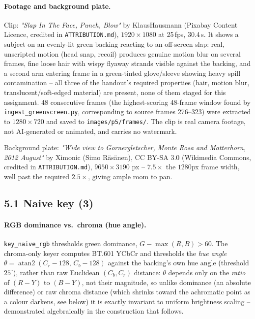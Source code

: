 \documentclass[11pt]{article}
\begin{document}
\paragraph{Footage and background plate.}
Clip: \emph{"Slap In The Face, Punch, Blow"} by KlausHausmann (Pixabay Content Licence,
credited in \texttt{ATTRIBUTION.md}), $1920\times1080$ at 25\,fps, 30.4\,s. It shows a subject
on an evenly-lit green backing reacting to an off-screen slap: real, unscripted motion (head
snap, recoil) produces genuine motion blur on several frames, fine loose hair with wispy
flyaway strands visible against the backing, and a second arm entering frame in a
green-tinted glove/sleeve showing heavy spill contamination -- all three of the handout's
required properties (hair, motion blur, translucent/soft-edged material) are present, none of
them staged for this assignment. 48 consecutive frames (the highest-scoring 48-frame window
found by \texttt{ingest\_greenscreen.py}, corresponding to source frames 276--323) were
extracted to $1280\times720$ and saved to \texttt{images/p5/frames/}. The clip is real
camera footage, not AI-generated or animated, and carries no watermark.

Background plate: \emph{"Wide view to Gornergletscher, Monte Rosa and Matterhorn, 2012
August"} by Ximonic (Simo Räsänen), CC BY-SA 3.0 (Wikimedia Commons, credited in
\texttt{ATTRIBUTION.md}), $9650\times3190$ px -- $7.5\times$ the $1280$px frame width, well
past the required $2.5\times$, giving ample room to pan.

\subsection*{5.1 Naive key (3)}

\paragraph{RGB dominance vs.\ chroma (hue angle).}
\texttt{key\_naive\_rgb} thresholds green dominance, $G-\max(R,B) > 60$. The chroma-only
keyer computes BT.601 YCbCr and thresholds the \emph{hue angle}
$\theta=\operatorname{atan2}(C_r-128,\,C_b-128)$ against the backing's own hue angle
(threshold $25^\circ$), rather than raw Euclidean $(C_b,C_r)$ distance: $\theta$ depends only
on the \emph{ratio} of $(R-Y)$ to $(B-Y)$, not their magnitude, so unlike dominance (an
absolute difference) or raw chroma distance (which shrinks toward the achromatic point as a
colour darkens, see below) it is exactly invariant to uniform brightness scaling --
demonstrated algebraically in the construction that follows.
\end{document}
